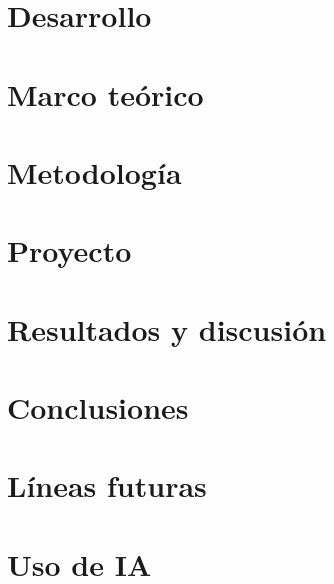 \documentclass[11pt,a4paper]{article}
\begin{document}
    \section{Desarrollo}\label{sec:desarrollo}
    

    \section{Marco teórico}\label{sec:marco-teorico}

    \section{Metodología}\label{sec:metodologia}

    \section{Proyecto}\label{sec:proyecto}
    

    \section{Resultados y discusión}\label{sec:resultados-discusion}
    

    \section{Conclusiones}\label{sec:conclusiones}

    \section{Líneas futuras}\label{sec:lineas-futuras}

    \section{Uso de IA}\label{sec:uso-ia}





    \printbibliography
\end{document}
